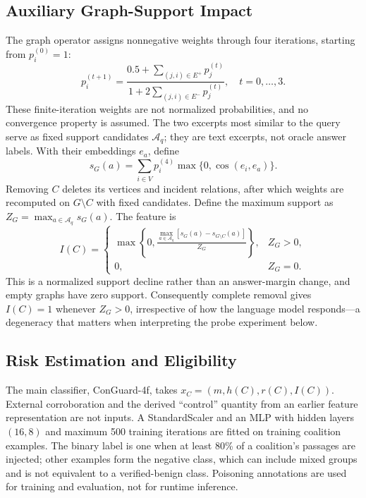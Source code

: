 \documentclass[sigconf]{aamas}
\begin{document}
\subsection{Auxiliary Graph-Support Impact}
\label{sec:impact}
The graph operator assigns nonnegative weights through four iterations, starting from $p_i^{(0)}=1$:
\begin{equation}
p_i^{(t+1)}=\frac{0.5+\sum_{(j,i)\in E^+}p_j^{(t)}}{1+2\sum_{(j,i)\in E^-}p_j^{(t)}},\quad t=0,\ldots,3.
\end{equation}
These finite-iteration weights are not normalized probabilities, and no convergence property is assumed. The two excerpts most similar to the query serve as fixed support candidates $\mathcal{A}_q$; they are text excerpts, not oracle answer labels. With their embeddings $e_a$, define
\begin{equation}
s_G(a)=\sum_{i\in V}p_i^{(4)}\max\{0,\cos(e_i,e_a)\}.
\end{equation}
Removing $C$ deletes its vertices and incident relations, after which weights are recomputed on $G\setminus C$ with fixed candidates. Define the maximum support as $Z_G=\max_{a\in\mathcal{A}_q}s_G(a)$. The feature is
\begin{equation}
I(C)=\begin{cases}
\displaystyle\max\left\{0,\frac{\max_{a\in\mathcal{A}_q}[s_G(a)-s_{G\setminus C}(a)]}{Z_G}\right\},&Z_G>0,\\
0,&Z_G=0.
\end{cases}
\label{eq:impact}
\end{equation}
This is a normalized support decline rather than an answer-margin change, and empty graphs have zero support. Consequently complete removal gives $I(C)=1$ whenever $Z_G>0$, irrespective of how the language model responds---a degeneracy that matters when interpreting the probe experiment below.

\subsection{Risk Estimation and Eligibility}
The main classifier, ConGuard-4f, takes $x_C=(m,h(C),r(C),I(C))$. External corroboration and the derived ``control'' quantity from an earlier feature representation are not inputs. A StandardScaler and an MLP with hidden layers $(16,8)$ and maximum 500 training iterations are fitted on training coalition examples. The binary label is one when at least 80\% of a coalition's passages are injected; other examples form the negative class, which can include mixed groups and is not equivalent to a verified-benign class. Poisoning annotations are used for training and evaluation, not for runtime inference.
\end{document}
